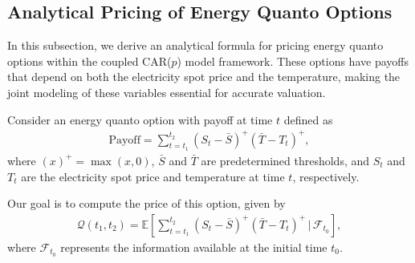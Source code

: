\documentclass[10pt,a4paper,reqno]{amsart}
\theoremstyle{example}
\begin{document}
\subsection{Analytical Pricing of Energy Quanto Options}\label{sec:quanto-option-pricing}

In this subsection, we derive an analytical formula for pricing energy quanto options within the coupled CAR($p$) model framework. These options have payoffs that depend on both the electricity spot price and the temperature, making the joint modeling of these variables essential for accurate valuation.

Consider an energy quanto option with payoff at time $t$ defined as
\begin{align}
\text{Payoff} = \sum_{t = t_1}^{t_2} \left( S_t - \bar{S} \right)^+ \left( \bar{T} - T_t \right)^+, \label{eq:quanto_payoff}
\end{align}
where $(x)^+ = \max(x, 0)$, $\bar{S}$ and $\bar{T}$ are predetermined thresholds, and $S_t$ and $T_t$ are the electricity spot price and temperature at time $t$, respectively.

Our goal is to compute the price of this option, given by
\begin{align}
\mathcal{Q}(t_1, t_2) = \mathbb{E} \left[ \sum_{t = t_1}^{t_2} \left( S_t - \bar{S} \right)^+ \left( \bar{T} - T_t \right)^+ \,\bigg|\, \mathcal{F}_{t_0} \right], \label{eq:quanto_option_price}
\end{align}
where $\mathcal{F}_{t_0}$ represents the information available at the initial
time $t_0$.  
\end{document}
